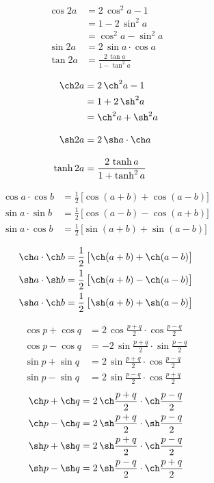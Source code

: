 \documentclass[class=report,crop=false]{standalone}
\begin{document}
\begin{multicols}{2}
\begin{align*}
\cos 2a &= 2\,\cos^2a-1\\
    &= 1-2\,\sin^2a\\
    &=\cos^2a-\sin^2a\\[3mm]
\sin 2a &= 2\,\sin a\cdot\cos a\\[3mm]
\tan 2a &= \frac{2\,\tan a}{1-\tan^2 a}
\end{align*}

\begin{align*}
\ch 2a &= 2\,\ch^2a-1\\
    &= 1+2\,\sh^2a\\
    &=\ch^2a+\sh^2a\\[3mm]
\sh 2a &= 2\,\sh a\cdot\ch a\\[3mm]
\tanh 2a &= \frac{2\,\tanh a}{1+\tanh^2 a}
\end{align*}
\end{multicols}


\begin{multicols}{2}
\small
\begin{align*}
\cos a\cdot\cos b &= \frac{1}{2}\,\big[ \cos(a+b)+\cos(a-b)\big]\\
\sin a\cdot\sin b &= \frac{1}{2}\,\big[ \cos(a-b)-\cos(a+b)\big]\\
\sin a\cdot\cos b &= \frac{1}{2}\,\big[ \sin(a+b)+\sin(a-b)\big]
\end{align*}

\begin{align*}
\ch a\cdot\ch b &= \frac{1}{2}\,\big[ \ch(a+b)+\ch(a-b)\big]\\
\sh a\cdot\sh b &= \frac{1}{2}\,\big[ \ch(a+b)-\ch(a-b)\big]\\
\sh a\cdot\ch b &= \frac{1}{2}\,\big[ \sh(a+b)+\sh(a-b)\big]
\end{align*}
\end{multicols}



\begin{multicols}{2}
\begin{align*}
\cos p+\cos q &= 2\,\cos \frac{p+q}{2}\cdot\cos\frac{p-q}{2}\\
\cos p-\cos q &= -2\,\sin \frac{p+q}{2}\cdot\sin \frac{p-q}{2}\\
\sin p+\sin q &= 2\,\sin \frac{p+q}{2}\cdot\cos\frac{p-q}{2}\\
\sin p-\sin q &= 2\,\sin \frac{p-q}{2}\cdot\cos\frac{p+q}{2}
\end{align*}\vspace{0.1cm}
\begin{align*}
\ch p+\ch q &= 2\,\ch \frac{p+q}{2}\cdot\ch\frac{p-q}{2}\\
\ch p-\ch q &= 2\,\sh \frac{p+q}{2}\cdot\sh \frac{p-q}{2}\\
\sh p+\sh q &= 2\,\sh \frac{p+q}{2}\cdot\ch\frac{p-q}{2}\\
\sh p-\sh q &= 2\,\sh \frac{p-q}{2}\cdot\ch\frac{p+q}{2}
\end{align*}
\end{multicols}
\end{document}
